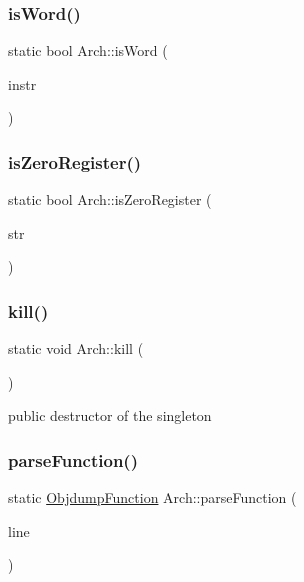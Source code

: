 \subsubsection{\texorpdfstring{is\+Word()}{isWord()}}
{\footnotesize\ttfamily static bool Arch\+::is\+Word (\begin{DoxyParamCaption}\item[{const \hyperlink{classObjdumpInstruction}{Objdump\+Instruction} \&}]{instr }\end{DoxyParamCaption})\hspace{0.3cm}{\ttfamily [static]}}

\mbox{\label{classArch_a5bd70d25a0dcb59d10cdb717c43842f2}} 
\subsubsection{\texorpdfstring{is\+Zero\+Register()}{isZeroRegister()}}
{\footnotesize\ttfamily static bool Arch\+::is\+Zero\+Register (\begin{DoxyParamCaption}\item[{const string \&}]{str }\end{DoxyParamCaption})\hspace{0.3cm}{\ttfamily [static]}}

\mbox{\label{classArch_a82f5b240caba345011c64b87f69d3573}} 
\subsubsection{\texorpdfstring{kill()}{kill()}}
{\footnotesize\ttfamily static void Arch\+::kill (\begin{DoxyParamCaption}{ }\end{DoxyParamCaption})\hspace{0.3cm}{\ttfamily [static]}}

public destructor of the singleton \mbox{\label{classArch_a086a563f23dcbab36b7238d131201471}} 
\subsubsection{\texorpdfstring{parse\+Function()}{parseFunction()}}
{\footnotesize\ttfamily static \hyperlink{classObjdumpFunction}{Objdump\+Function} Arch\+::parse\+Function (\begin{DoxyParamCaption}\item[{const string \&}]{line }\end{DoxyParamCaption})\hspace{0.3cm}{\ttfamily [static]}}

